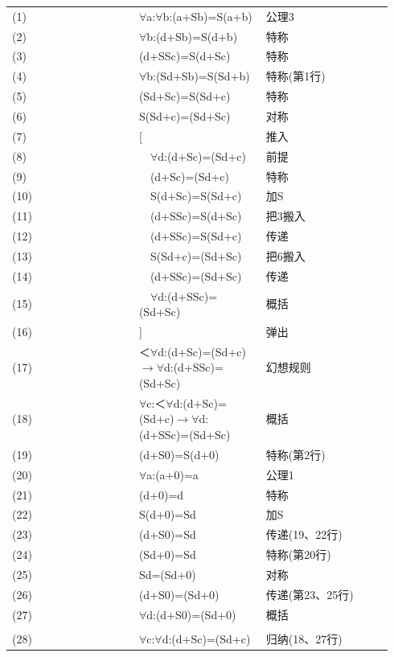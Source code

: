 \documentclass[
  12pt,
  twoside,
  openright,
  oldfontcommands,
]{memoir}
\begin{document}
\begin{longtable}[]{>{\raggedright\arraybackslash}p{0.313\linewidth} >{\raggedright\arraybackslash}p{0.313\linewidth} >{\raggedright\arraybackslash}p{0.313\linewidth}}
\toprule\noalign{}
\endhead
\bottomrule\noalign{}
\endlastfoot
(1) & $\forall$a:$\forall$b:(a+Sb)=S(a+b) & 公理3 \\
(2) & $\forall$b:(d+Sb)=S(d+b) & 特称 \\
(3) & (d+SSc)=S(d+Sc) & 特称 \\
(4) & $\forall$b:(Sd+Sb)=S(Sd+b) & 特称(第1行) \\
(5) & (Sd+Sc)=S(Sd+c) & 特称 \\
(6) & S(Sd+c)=(Sd+Sc) & 对称 \\
(7) & {[} & 推入 \\
(8) & 　$\forall$d:(d+Sc)=(Sd+c) & 前提 \\
(9) & 　(d+Sc)=(Sd+c) & 特称 \\
(10) & 　S(d+Sc)=S(Sd+c) & 加S \\
(11) & 　(d+SSc)=S(d+Sc) & 把3搬入 \\
(12) & 　(d+SSc)=S(Sd+c) & 传递 \\
(13) & 　S(Sd+c)=(Sd+Sc) & 把6搬入 \\
(14) & 　(d+SSc)=(Sd+Sc) & 传递 \\
(15) & 　$\forall$d:(d+SSc)=(Sd+Sc) & 概括 \\
(16) & {]} & 弹出 \\
(17) & ＜$\forall$d:(d+Sc)=(Sd+c)$\rightarrow$$\forall$d:(d+SSc)=(Sd+Sc) & 幻想规则 \\
(18) & $\forall$c:＜$\forall$d:(d+Sc)=(Sd+c)$\rightarrow$$\forall$d:(d+SSc)=(Sd+Sc) & 概括 \\
(19) & (d+S0)=S(d+0) & 特称(第2行) \\
(20) & $\forall$a:(a+0)=a & 公理1 \\
(21) & (d+0)=d & 特称 \\
(22) & S(d+0)=Sd & 加S \\
(23) & (d+S0)=Sd & 传递(19、22行) \\
(24) & (Sd+0)=Sd & 特称(第20行) \\
(25) & Sd=(Sd+0) & 对称 \\
(26) & (d+S0)=(Sd+0) & 传递(第23、25行) \\
(27) & $\forall$d:(d+S0)=(Sd+0) & 概括 \\
\multicolumn{3}{@{}l@{}}{%
*　*　*　*　*} \\
(28) & $\forall$c:$\forall$d:(d+Sc)=(Sd+c) & 归纳(18、27行) \\

\end{longtable}
\end{document}
